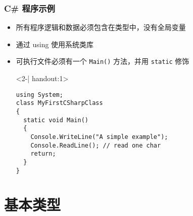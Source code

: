 \begin{frame}[fragile]
\frametitle{C\# 程序示例}
\begin{itemize}
\item<1-| handout:1> 所有程序逻辑和数据必须包含在类型中，没有全局变量

\item<1-| handout:1> 通过 using 使用系统类库

\item<1-| handout:1> 可执行文件必须有一个 \texttt{Main()} 方法，并用 \texttt{static} 修饰

  \begin{uncoverenv}<2-| handout:1>
\begin{lstlisting}
using System;
class MyFirstCSharpClass
{
  static void Main()
  {
    Console.WriteLine("A simple example");
    Console.ReadLine(); // read one char
    return;
  }
}
\end{lstlisting}
  \end{uncoverenv}

\end{itemize}
\end{frame}


\section{基本类型}


